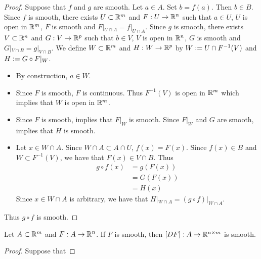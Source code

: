 \documentclass{book}
\begin{document}
	\begin{proof}
		Suppose that $f$ and $g$ are smooth. Let $a \in A$. Set $b = f(a)$. Then $b \in B$. Since $f$ is smooth, there exists $U \subset \mathbb{R}^m$ and $F:U \rightarrow \mathbb{R}^n$ such that $a \in U$, $U$ is open in $\mathbb{R}^m$, $F$ is smooth and $F|_{U \cap A} = f|_{U \cap A}$. Since $g$ is smooth, there exists $V \subset \mathbb{R}^n$ and $G:V \rightarrow \mathbb{R}^p$ such that $b \in V$, $V$ is open in $\mathbb{R}^n$, $G$ is smooth and $G|_{V \cap B} = g|_{V \cap B}$. We define $W \subset \mathbb{R}^m$ and $H:W \rightarrow \mathbb{R}^p$ by $W \vcentcolon= U \cap F^{-1}(V)$ and $H \vcentcolon= G \circ F|_W$. 
		\begin{itemize}
			\item By construction, $a \in W$. 
			\item Since $F$ is smooth, $F$ is continuous. Thus $F^{-1}(V)$ is open in $\mathbb{R}^m$ which implies that $W$ is open in $\mathbb{R}^m$. 
			\item Since $F$ is smooth,  implies that $F|_W$ is smooth. Since $F|_W$ and $G$ are smooth,  implies that $H$ is smooth. 
			\item Let $x \in W \cap A$. Since $W \cap A \subset A \cap U$, $f(x) = F(x)$. Since $f(x) \in B$ and $W \subset F^{-1}(V)$, we have that $F(x) \in V \cap B$. Thus  
			\begin{align*}
				g \circ f(x)
				& = g (F(x)) \\
				& = G(F(x)) \\
				& = H(x) 
			\end{align*} 
			Since $x \in W \cap A$ is arbitrary, we have that $H|_{W \cap A} = (g \circ f)|_{W \cap A}$.
		\end{itemize}
		Thus $g \circ f$ is smooth.
	\end{proof}
	
	\begin{ex}
		Let $A \subset \mathbb{R}^m$ and $F:A \rightarrow \mathbb{R}^n$. If $F$ is smooth, then $[DF]:A \rightarrow \mathbb{R}^{n \times m}$ is smooth. 
	\end{ex}
	
	\begin{proof}
		Suppose that 
	\end{proof}
	
	
	
	
	
	
	
	
	
	
	
	
	
\end{document}
